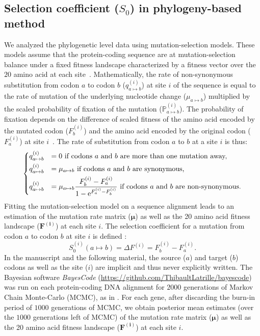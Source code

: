 \documentclass{article}
\newcommand{\UniDimArray}[1]{\bm{#1}}
\newcommand{\e}{\textrm{e}}
\newcommand{\proba}{\mathbb{P}}
\newcommand{\Sphy}{S_{0}}
\begin{document}
    \subsection{Selection coefficient ($\Sphy$) in phylogeny-based method}
    \label{subsec:s-phylogeny-method}
    We analyzed the phylogenetic level data using mutation-selection models.
    These models assume that the protein-coding sequence are at mutation-selection balance under a fixed fitness landscape characterized by a fitness vector over the $20$ amino acid at each site~\cite{yang_mutationselection_2008, halpern_evolutionary_1998, rodrigue_mechanistic_2010}.
    Mathematically, the rate of non-synonymous substitution from codon $a$ to codon $b$ ($q_{a \mapsto b}^{(i)}$) at site $i$ of the sequence is equal to the rate of mutation of the underlying nucleotide change ($\mu_{a \mapsto b}$) multiplied by the scaled probability of fixation of the mutation ($\proba_{a \mapsto b}^{(i)}$).
    The probability of fixation depends on the difference of scaled fitness of the amino acid encoded by the mutated codon ($F_b^{(i)}$) and the amino acid encoded by the original codon ($F_a^{(i)}$) at site $i$~\cite{wright_evolution_1931a, fisher_genetical_1930a}.
    The rate of substitution from codon $a$ to $b$ at a site $i$ is thus:
    \begin{equation}
        \begin{dcases}
            q_{a \mapsto b}^{(i)} & = 0 \text{ if codons $a$ and $b$ are more than one mutation away,} \\
            q_{a \mapsto b}^{(i)} & = \mu_{a \mapsto b} \text{ if codons $a$ and $b$ are synonymous,} \\
            q_{a \mapsto b}^{(i)} & = \mu_{a \mapsto b} \dfrac{F_b^{(i)} - F_a^{(i)}}{1 - \e^{F_a^{(i)} - F_b^{(i)}}} \text{ if codons $a$ and $b$ are non-synonymous}.
        \end{dcases}
    \end{equation}
    Fitting the mutation-selection model on a sequence alignment leads to an estimation of the mutation rate matrix ($\UniDimArray{\mu}$) as well as the 20 amino acid fitness landscape ($\UniDimArray{F^{(i)}}$) at each site $i$.
    The selection coefficient for a mutation from codon $a$ to codon $b$ at site $i$ is defined :
    \begin{equation}
        \Sphy^{(i)} (a \mapsto b) = \Delta F^{(i)} = F^{(i)}_{b} - F^{(i)}_{a}.
    \end{equation}
    In the manuscript and the following material, the source ($a$) and target ($b$) codons as well as the site ($i$) are implicit and thus never explicitly written.
    The Bayesian software \textit{BayesCode} (\url{https://github.com/ThibaultLatrille/bayescode}) was run on each protein-coding DNA alignment for $2000$ generations of Markov Chain Monte-Carlo (MCMC), as in \textcite{latrille_genes_2022}.
    For each gene, after discarding the burn-in period of $1000$ generations of MCMC, we obtain posterior mean estimates (over the $1000$ generations left of MCMC) of the mutation rate matrix ($\UniDimArray{\mu}$) as well as the 20 amino acid fitness landscape ($\UniDimArray{F^{(i)}}$) at each site $i$.
\end{document}
